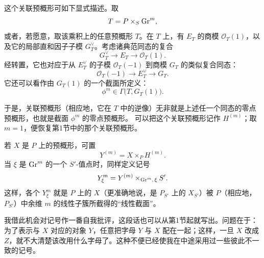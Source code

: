 这个关联预概形可如下显式描述。取
\[
T=P\times_S\operatorname{Gr}^{m},
\]
或者，若愿意，取该乘积上的任意预概形 $T$。在 $T$ 上，有 $E_T$ 的商模 $\mathcal O_T(1)$，以及它的局部直和因子子模 $G_T^\vee$。考虑诸典范同态的复合
\[
G_T^\vee\longrightarrow E_T\longrightarrow\mathcal O_T(1).
\]
经转置，它也对应于从 $E_T^\vee$ 的子模 $\mathcal O_T(-1)$ 到商模 $G_T$ 的类似复合同态：
\[
\mathcal O_T(-1)\longrightarrow E_T^\vee\longrightarrow G_T.
\]
它还可以看作由 $G_T(1)$ 的一个截面所定义：
\[
\phi^m\in\Gamma\bigl(T,G_T(1)\bigr).
\]

于是，关联预概形（相应地，它在 $T$ 中的逆像）无非就是上述任一个同态的零点预概形，也就是截面 $\phi^m$ 的零点预概形。
可以把这个关联预概形记作 $H^{(m)}$；取 $m=1$，便恢复第1节中的那个关联预概形。

若 $X$ 是 $P$ 上的预概形，可置
\[
Y^{(m)}=X\times_P H^{(m)}.
\]
当 $\xi$ 是 $\operatorname{Gr}^m$ 的一个 $S'$-值点时，同样定义记号
\[
Y^m_\xi=Y^{(m)}\times_{\operatorname{Gr}^m,\,\xi}S'.
\]
这样，各个 $Y^m_\xi$ 就是 $P$ 上的 $X$（更准确地说，是 $P_{S'}$ 上的 $X_{S'}$）被 $P$（相应地，$P_{S'}$）中余维 $m$ 的线性子簇所截得的“线性截面”。

我借此机会对记号作一番自我批评，这段话也可以从第1节起就写出。问题在于：为了表示与 $X$ 对应的对象 $Y$，任意把字母 $Y$ 与 $X$ 配在一起；这样，一旦 $X$ 改成 $Z$，就不大清楚该改用什么字母了。这种不便已经使我在中途采用过一些彼此不一致的记号。


